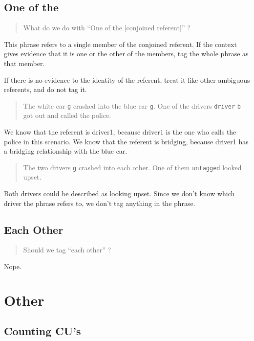 \documentclass[
]{book}
\begin{document}
\hypertarget{one-of-the}{%
\subsection{One of the}\label{one-of-the}}

\begin{quote}
What do we do with ``One of the {[}conjoined referent{]}'' ?
\end{quote}

This phrase refers to a single member of the conjoined referent.
If the context gives evidence that it is one or the other of the members, tag the whole phrase as that member.

If there is no evidence to the identity of the referent, treat it like other ambiguous referents, and do not tag it.

\begin{quote}
The white car \texttt{g} crashed into the blue car \texttt{g}.
One of the drivers \texttt{driver} \texttt{b} got out and called the police.
\end{quote}

We know that the referent is driver1, because driver1 is the one who calls the police in this scenario.
We know that the referent is bridging, because driver1 has a bridging relationship with the blue car.

\begin{quote}
The two drivers \texttt{g} crashed into each other.
One of them \texttt{untagged} looked upset.
\end{quote}

Both drivers could be described as looking upset.
Since we don't know which driver the phrase refers to, we don't tag anything in the phrase.

\hypertarget{each-other}{%
\subsection{Each Other}\label{each-other}}

\begin{quote}
Should we tag ``each other'' ?
\end{quote}

Nope.

\hypertarget{other}{%
\section{Other}\label{other}}

\hypertarget{counting-cus}{%
\subsection{Counting CU's}\label{counting-cus}}
\end{document}
